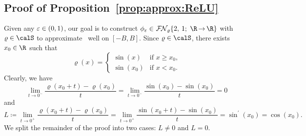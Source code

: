 \documentclass[11pt,a4paper]{article}
\begin{document}


\subsection{Proof of Proposition~\ref{prop:approx:ReLU}}
\label{sec:proof:prop:approx:ReLU}


Given any $\varepsilon\in (0,1)$, our goal is to construct $\phi_\eps\in \nn{\varrho}{2}{1}{\R}{\R}$ with $\varrho\in \calS$ to approximate \ReLU\  well on $[-B,B]$.
Since $\varrho\in \calS$, there exists  $x_0\in\R$ such that
\begin{equation*}
    \varrho(x) = 
\begin{cases} 
\sin(x) & \text{if } x \ge x_0, \\ 
\sin(x_0) & \text{if } x < x_0.
\end{cases}
\end{equation*}
Clearly, we have
	\begin{equation*}
		\lim_{t\to 0^-}\frac{\varrho (x_0+t)-\varrho (x_0)}{t}=\lim_{t\to 0^-}\frac{\sin(x_0)-\sin(x_0)}{t}=0
	\end{equation*}
    and 
    \begin{equation*}
L\coloneqq \lim_{t\to 0^+}\frac{\varrho (x_0+t)-\varrho (x_0)}{t}
=\lim_{t\to 0^+}\frac{\sin (x_0+t)-\sin (x_0)}{t}=\sin^\prime(x_0)=\cos(x_0).
\end{equation*}
We split the remainder of the proof into two cases: \( L \neq 0 \) and \( L = 0 \).
\end{document}
